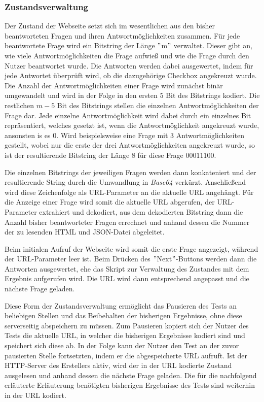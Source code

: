 \subsubsection{Zustandsverwaltung}

Der Zustand der Webseite setzt sich im wesentlichen aus den bisher beantworteten Fragen und ihren Antwortmöglichkeiten zusammen. Für jede beantwortete Frage wird ein Bitstring der Länge $"$m$"$ verwaltet. Dieser gibt an, wie viele Antwortmöglichkeiten die Frage aufwieß und wie die Frage durch den Nutzer beantwortet wurde. Die Antworten werden dabei ausgewertet, indem für jede Antwortet überprüft wird, ob die dazugehörige Checkbox angekreuzt wurde. Die Anzahl der Antwortmöglichkeiten einer Frage wird zunächst binär umgewandelt und wird in der Folge in den ersten $5$ Bit des Bitstrings kodiert. Die restlichen $m - 5$ Bit des Bitstrings stellen die einzelnen Antwortmöglichkeiten der Frage dar. Jede einzelne Antwortmöglichkeit wird dabei durch ein einzelnes Bit repräsentiert, welches gesetzt ist, wenn die Antwortmöglichkeit angekreuzt wurde, ansonsten is es $0$. Wird beispielsweise eine Frage mit $3$ Antwortmöglichkeiten gestellt, wobei nur die erste der drei Antwortmöglichkeiten angekreuzt wurde, so ist der resultierende Bitstring der Länge $8$ für diese Frage $00011100$.


Die einzelnen Bitstrings der jeweiligen Fragen werden dann konkateniert und der resultierende String durch die Umwandlung in \textit{Base64} verkürzt. Anschließend wird diese Zeichenfolge als URL-Parameter an die aktuelle URL angehängt. Für die Anzeige einer Frage wird somit die aktuelle URL abgerufen, der URL-Parameter extrahiert und dekodiert, aus dem dekodierten Bitstring dann die Anzahl bisher beantworteter Fragen errechnet und anhand dessen die Nummer der zu lesenden HTML und JSON-Datei abgeleitet.

Beim initialen Aufruf der Webseite wird somit die erste Frage angezeigt, während der URL-Parameter leer ist. Beim Drücken des $"$Next$"$-Buttons werden dann die Antworten ausgewertet, ehe das Skript zur Verwaltung des Zustandes mit dem Ergebnis aufgerufen wird. Die URL wird dann entsprechend angepasst und die nächste Frage geladen.

Diese Form der Zustandsverwaltung ermöglicht das Pausieren des Tests an beliebigen Stellen und das Beibehalten der bisherigen Ergebnisse, ohne diese serverseitig abspeichern zu müssen. Zum Pausieren kopiert sich der Nutzer des Tests die aktuelle URL, in welcher die bisherigen Ergebnisse kodiert sind und speichert sich diese ab. In der Folge kann der Nutzer den Test an der zuvor pausierten Stelle fortsetzten, indem er die abgespeicherte URL aufruft. Ist der HTTP-Server des Erstellers aktiv, wird der in der URL kodierte Zustand ausgelesen und anhand dessen die nächste Frage geladen. Die für die nachfolgend erläuterte Erläuterung benötigten bisherigen Ergebnisse des Tests sind weiterhin in der URL kodiert.

